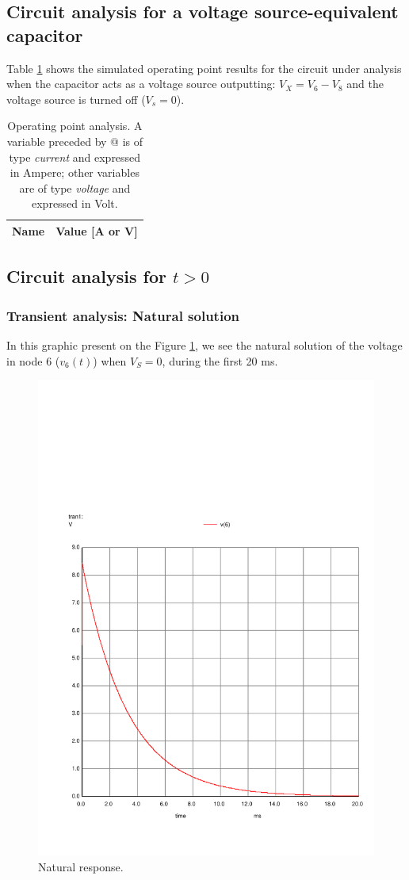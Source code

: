 \subsection{Circuit analysis for a voltage source-equivalent capacitor}

\indent

Table \ref{tab:Op2Ng} shows the simulated operating point results for the circuit under analysis when the capacitor acts as a voltage source outputting: $V_X=V_6-V_8$ and the voltage source is turned off ($V_s=0$).
\begin{table}[H]
  \centering
  \begin{tabular}{|l|r|}
    \hline    
    {\bf Name} & {\bf Value [A or V]} \\ \hline
    
  \end{tabular}
  \caption{Operating point analysis. A variable preceded by @ is of type {\em current}
    and expressed in Ampere; other variables are of type {\it voltage} and expressed in
    Volt.}
  \label{tab:Op2Ng}
\end{table}


\subsection{Circuit analysis for $t>0$}

\indent

\subsubsection{Transient analysis: Natural solution}

\indent

In this graphic  present on the Figure \ref{fig:NatNg}, we see the natural solution of the voltage in node 6 ($v_6(t)$) when $V_S=0$, during the first 20 ms. 


\begin{figure}[H] \centering
    \includegraphics[width=0.6\linewidth, trim={2cm 1.5cm 0.5cm 6cm}, clip]{../Simulation/trans_nat.pdf}
    \caption{Natural response.}
    \label{fig:NatNg}
\end{figure}



